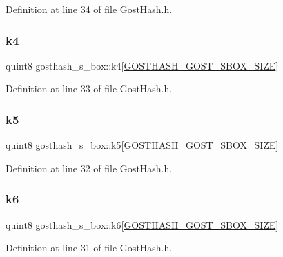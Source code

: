 Definition at line 34 of file Gost\+Hash.\+h.

\mbox{\label{structgosthash__s__box_a473e4be37f837c33f3e3d4d9f06ce7c5}} 
\subsubsection{\texorpdfstring{k4}{k4}}
{\footnotesize\ttfamily quint8 gosthash\+\_\+s\+\_\+box\+::k4\mbox{[}\hyperlink{_gost_hash_8h_af1180f1c3243bbce8ea02985c5f44bfe}{G\+O\+S\+T\+H\+A\+S\+H\+\_\+\+G\+O\+S\+T\+\_\+\+S\+B\+O\+X\+\_\+\+S\+I\+ZE}\mbox{]}}



Definition at line 33 of file Gost\+Hash.\+h.

\mbox{\label{structgosthash__s__box_a136843f275f13620ff7b2274c0122f7f}} 
\subsubsection{\texorpdfstring{k5}{k5}}
{\footnotesize\ttfamily quint8 gosthash\+\_\+s\+\_\+box\+::k5\mbox{[}\hyperlink{_gost_hash_8h_af1180f1c3243bbce8ea02985c5f44bfe}{G\+O\+S\+T\+H\+A\+S\+H\+\_\+\+G\+O\+S\+T\+\_\+\+S\+B\+O\+X\+\_\+\+S\+I\+ZE}\mbox{]}}



Definition at line 32 of file Gost\+Hash.\+h.

\mbox{\label{structgosthash__s__box_a50201229bf8e363da3c6eae9fc9bbf24}} 
\subsubsection{\texorpdfstring{k6}{k6}}
{\footnotesize\ttfamily quint8 gosthash\+\_\+s\+\_\+box\+::k6\mbox{[}\hyperlink{_gost_hash_8h_af1180f1c3243bbce8ea02985c5f44bfe}{G\+O\+S\+T\+H\+A\+S\+H\+\_\+\+G\+O\+S\+T\+\_\+\+S\+B\+O\+X\+\_\+\+S\+I\+ZE}\mbox{]}}



Definition at line 31 of file Gost\+Hash.\+h.

